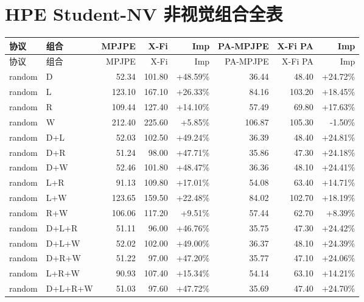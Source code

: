 \documentclass[UTF8,10pt]{ctexart}
\newcommand{\better}[1]{\textcolor{goodblue}{#1}}
\newcommand{\worse}[1]{\textcolor{badred}{#1}}
\begin{document}
\section{HPE Student-NV 非视觉组合全表}
{\tiny
\begin{longtable}{llrrrrrr}
\toprule
协议 & 组合 & MPJPE & X-Fi & Imp & PA-MPJPE & X-Fi PA & Imp\\
\midrule
\endfirsthead
\toprule
协议 & 组合 & MPJPE & X-Fi & Imp & PA-MPJPE & X-Fi PA & Imp\\
\midrule
\endhead
random & D & 52.34 & 101.80 & \better{+48.59\%} & 36.44 & 48.40 & \better{+24.72\%}\\
random & L & 123.10 & 167.10 & \better{+26.33\%} & 84.16 & 103.20 & \better{+18.45\%}\\
random & R & 109.44 & 127.40 & \better{+14.10\%} & 57.49 & 69.80 & \better{+17.63\%}\\
random & W & 212.40 & 225.60 & \better{+5.85\%} & 106.87 & 105.30 & \worse{-1.50\%}\\
random & D+L & 52.03 & 102.50 & \better{+49.24\%} & 36.39 & 48.40 & \better{+24.81\%}\\
random & D+R & 51.24 & 98.00 & \better{+47.71\%} & 35.86 & 47.30 & \better{+24.18\%}\\
random & D+W & 52.46 & 101.80 & \better{+48.47\%} & 36.36 & 48.10 & \better{+24.41\%}\\
random & L+R & 91.13 & 109.80 & \better{+17.01\%} & 54.08 & 63.40 & \better{+14.71\%}\\
random & L+W & 123.65 & 159.50 & \better{+22.48\%} & 84.02 & 102.70 & \better{+18.19\%}\\
random & R+W & 106.06 & 117.20 & \better{+9.51\%} & 57.44 & 62.70 & \better{+8.39\%}\\
random & D+L+R & 51.11 & 96.00 & \better{+46.76\%} & 35.75 & 47.30 & \better{+24.42\%}\\
random & D+L+W & 52.02 & 102.00 & \better{+49.00\%} & 36.37 & 48.10 & \better{+24.39\%}\\
random & D+R+W & 51.22 & 97.00 & \better{+47.20\%} & 35.77 & 47.10 & \better{+24.06\%}\\
random & L+R+W & 90.93 & 107.40 & \better{+15.34\%} & 54.14 & 63.10 & \better{+14.21\%}\\
random & D+L+R+W & 51.03 & 97.60 & \better{+47.72\%} & 35.69 & 47.40 & \better{+24.70\%}\\


\end{longtable}}
\end{document}
